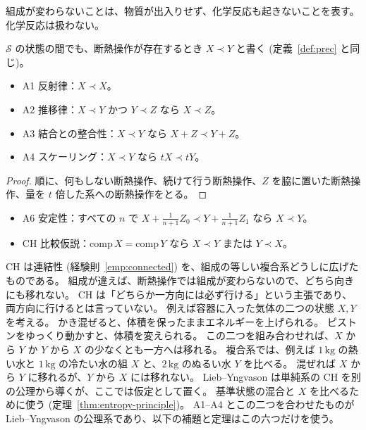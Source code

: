 組成が変わらないことは、物質が出入りせず、化学反応も起きないことを表す。
化学反応は扱わない。

\begin{definition}[複合系の断熱到達性]
  \label{def:adiabatic}
  \leanok
  $\mathcal{S}$ の状態の間でも、断熱操作が存在するとき $X \prec Y$ と書く (定義~\ref{def:prec} と同じ)。
\end{definition}

\begin{theorem}[断熱到達性の性質]
  \label{thm:accessibility-axioms}
  \leanok
  \begin{itemize}
    \item A1 反射律：$X \prec X$。
    \item A2 推移律：$X \prec Y$ かつ $Y \prec Z$ なら $X \prec Z$。
    \item A3 結合との整合性：$X \prec Y$ なら $X + Z \prec Y + Z$。
    \item A4 スケーリング：$X \prec Y$ なら $tX \prec tY$。
  \end{itemize}
\end{theorem}

\begin{proof}
  \leanok
  順に、何もしない断熱操作、続けて行う断熱操作、$Z$ を脇に置いた断熱操作、量を $t$ 倍した系への断熱操作をとる。
\end{proof}

\begin{empirical}[安定性と比較仮説]
  \label{emp:stability-ch}
  \leanok
  \begin{itemize}
    \item A6 安定性：すべての $n$ で $X + \frac{1}{n+1} Z_0 \prec Y + \frac{1}{n+1} Z_1$ なら $X \prec Y$。
    \item CH 比較仮説：$\mathrm{comp}\, X = \mathrm{comp}\, Y$ なら $X \prec Y$ または $Y \prec X$。
  \end{itemize}
\end{empirical}

CH は連結性 (経験則~\ref{emp:connected}) を、組成の等しい複合系どうしに広げたものである。
組成が違えば、断熱操作では組成が変わらないので、どちら向きにも移れない。
CH は「どちらか一方向には必ず行ける」という主張であり、両方向に行けるとは言っていない。
例えば容器に入った気体の二つの状態 $X, Y$ を考える。
かき混ぜると、体積を保ったままエネルギーを上げられる。
ピストンをゆっくり動かすと、体積を変えられる。
この二つを組み合わせれば、$X$ から $Y$ か $Y$ から $X$ の少なくとも一方へは移れる。
複合系では、例えば $1\,\mathrm{kg}$ の熱い水と $1\,\mathrm{kg}$ の冷たい水の組 $X$ と、$2\,\mathrm{kg}$ のぬるい水 $Y$ を比べる。
混ぜれば $X$ から $Y$ に移れるが、$Y$ から $X$ には移れない。
Lieb--Yngvason は単純系の CH を別の公理から導くが、ここでは仮定として置く。
基準状態の混合と $X$ を比べるために使う (定理~\ref{thm:entropy-principle})。
A1--A4 とこの二つを合わせたものが Lieb--Yngvason の公理系であり、以下の補題と定理はこの六つだけを使う。

